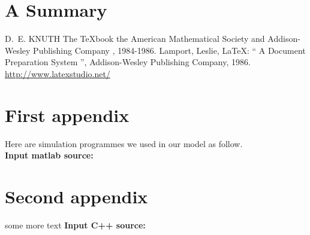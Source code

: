 \documentclass[12pt]{article}
\begin{document}
	
	
	\newpage
	\tableofcontents
	
	
	
	
	
	
	
	
	
	
	
	
	
	
	
	
	\section{A Summary}
	\lipsum[6]
	
	
	
	
	
	
	
	
	
	\begin{thebibliography}{99}
		 D.~E. KNUTH   The \TeX{}book  the American
		Mathematical Society and Addison-Wesley
		Publishing Company , 1984-1986.
		Lamport, Leslie,  \LaTeX{}: `` A Document Preparation System '',
		Addison-Wesley Publishing Company, 1986.
		\url{http://www.latexstudio.net/}
	\end{thebibliography}
	
	
	
	\begin{appendices}
		\section{First appendix}
		\lipsum[13]
		Here are simulation programmes we used in our model as follow.\\
		\textbf{\textcolor[rgb]{0.98,0.00,0.00}{Input matlab source:}}
		
		\section{Second appendix}
		some more text \textcolor[rgb]{0.98,0.00,0.00}{\textbf{Input C++ source:}}
		
	\end{appendices}
	
	
	
	
\end{document}
